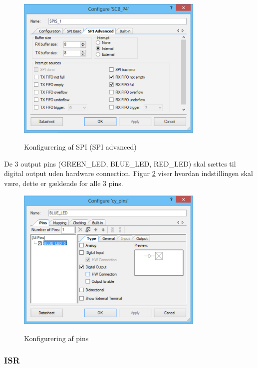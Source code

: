 \begin{figure}[H] \centering
{\includegraphics[width=0.8\textwidth]{filer/implementering/spi/spi_handler_topdesign_spi_advanced}}
\caption{Konfigurering af SPI (SPI advanced)}
\label{lab:spi_advanced_config}
\raggedright
\end{figure}

De 3 output pins (GREEN\_LED, BLUE\_LED, RED\_LED) skal sættes til digital output uden hardware connection.
Figur \ref{lab:led_pins_config} viser hvordan indstillingen skal være, dette er gældende for alle 3 pins. 

\begin{figure}[H] \centering
{\includegraphics[width=0.8\textwidth]{filer/implementering/spi/spi_handler_topdesign_led}}
\caption{Konfigurering af pins}
\label{lab:led_pins_config}
\raggedright
\end{figure}


\subsubsection*{ISR}

